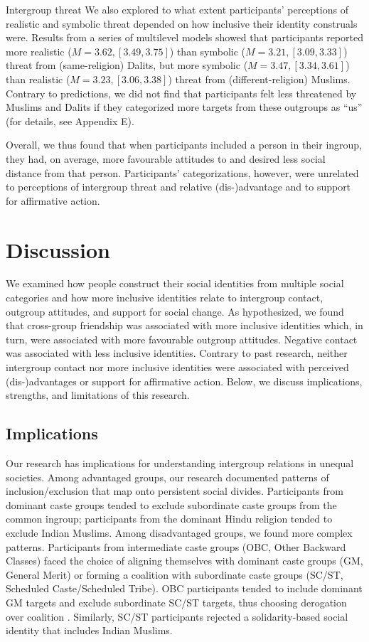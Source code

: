 \documentclass[12pt, a4paper]{article}
\begin{document}
Intergroup threat
We also explored to what extent participants’ perceptions of realistic and symbolic threat depended on how inclusive their identity construals were. Results from a series of multilevel models showed that participants reported more realistic ($M = 3.62, [3.49, 3.75]$) than symbolic ($M = 3.21, [3.09, 3.33]$) threat from (same-religion) Dalits, but more symbolic ($M = 3.47, [3.34, 3.61]$) than realistic ($M = 3.23, [3.06, 3.38]$) threat from (different-religion) Muslims. Contrary to predictions, we did not find that participants felt less threatened by Muslims and Dalits if they categorized more targets from these outgroups as “us” (for details, see Appendix E).

Overall, we thus found that when participants included a person in their ingroup, they had, on average, more favourable attitudes to and desired less social distance from that person. Participants’ categorizations, however, were unrelated to perceptions of intergroup threat and relative (dis-)advantage and to support for affirmative action.

\section{Discussion}

We examined how people construct their social identities from multiple social categories and how more inclusive identities relate to intergroup contact, outgroup attitudes, and support for social change. As hypothesized, we found that cross-group friendship was associated with more inclusive identities which, in turn, were associated with more favourable outgroup attitudes. Negative contact was associated with less inclusive identities. Contrary to past research, neither intergroup contact nor more inclusive identities were associated with perceived (dis-)advantages or support for affirmative action. Below, we discuss implications, strengths, and limitations of this research.

\subsection{Implications}

Our research has implications for understanding intergroup relations in unequal societies. Among advantaged groups, our research documented patterns of inclusion/exclusion that map onto persistent social divides. Participants from dominant caste groups tended to exclude subordinate caste groups from the common ingroup; participants from the dominant Hindu religion tended to exclude Indian Muslims. Among disadvantaged groups, we found more complex patterns. Participants from intermediate caste groups (OBC, Other Backward Classes) faced the choice of aligning themselves with dominant caste groups (GM, General Merit) or forming a coalition with subordinate caste groups (SC/ST, Scheduled Caste/Scheduled Tribe). OBC participants tended to include dominant GM targets and exclude subordinate SC/ST targets, thus choosing derogation over coalition \parencite{craig_coalition_2012}. Similarly, SC/ST participants rejected a solidarity-based social identity that includes Indian Muslims.
\end{document}
